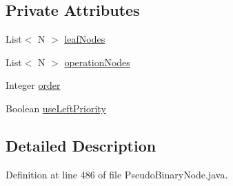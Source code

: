 \subsection*{Private Attributes}
\begin{DoxyCompactItemize}
\item 
List$<$ N $>$ \hyperlink{classit_1_1emarolab_1_1cagg_1_1core_1_1PseudoBinaryNode_1_1PseudoBinaryTreeGenerator_3_01N_01extends_01PseudoBinaryNode_01_4_a9f34a5fededd54a1c287b4ac6fbd7d34}{leaf\-Nodes}
\item 
List$<$ N $>$ \hyperlink{classit_1_1emarolab_1_1cagg_1_1core_1_1PseudoBinaryNode_1_1PseudoBinaryTreeGenerator_3_01N_01extends_01PseudoBinaryNode_01_4_a5e81de84f6e7f8a1c3c48e686afad3b2}{operation\-Nodes}
\item 
Integer \hyperlink{classit_1_1emarolab_1_1cagg_1_1core_1_1PseudoBinaryNode_1_1PseudoBinaryTreeGenerator_3_01N_01extends_01PseudoBinaryNode_01_4_a30f909e3ad1783efcad6a4e673d9bfd8}{order}
\item 
Boolean \hyperlink{classit_1_1emarolab_1_1cagg_1_1core_1_1PseudoBinaryNode_1_1PseudoBinaryTreeGenerator_3_01N_01extends_01PseudoBinaryNode_01_4_a011b9db819d6a595cb4cabe9a7968198}{use\-Left\-Priority}
\end{DoxyCompactItemize}


\subsection{Detailed Description}


Definition at line 486 of file Pseudo\-Binary\-Node.\-java.



